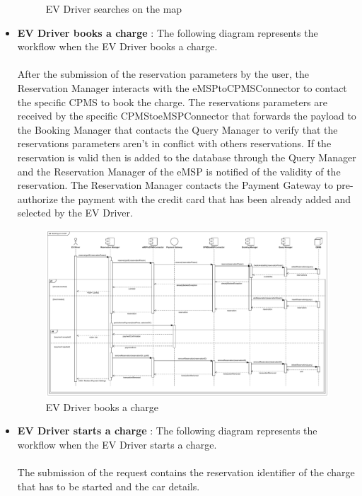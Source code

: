 \begin{itemize}
\begin{figure}[H]
              \caption{EV Driver searches on the map}
          \end{figure}
          \pagebreak
    \item \textbf{EV Driver books a charge} : The following diagram represents the workflow when the EV Driver books a charge.\\
          \\After the submission of the reservation parameters by the user, the Reservation Manager interacts with the eMSPtoCPMSConnector to
          contact the specific CPMS to book the charge. The reservations parameters are received by the specific CPMStoeMSPConnector that
          forwards the payload to the Booking Manager that contacts the Query Manager to verify that the reservations parameters aren't in
          conflict with others reservations. If the reservation is valid then is added to the database through the Query Manager and the Reservation
          Manager of the eMSP is notified of the validity of the reservation. The Reservation Manager contacts the Payment Gateway to pre-authorize the
          payment with the credit card that has been already added and selected by the EV Driver.
          \begin{figure}[H]
              \centering
              \hspace*{-2cm}
              \includegraphics[scale=0.48]{src/runtimeView/eMSP_Book.pdf}
              \caption{EV Driver books a charge}
          \end{figure}
          \pagebreak
    \item \textbf{EV Driver starts a charge} : The following diagram represents the workflow when the EV Driver starts a charge.\\
          \\The submission of the request contains the reservation identifier of the charge that has to be started and the car details.

\end{itemize}
